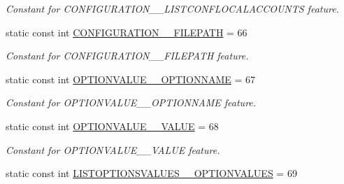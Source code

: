 \begin{DoxyCompactItemize}
\begin{DoxyCompactList}\small\item\em Constant for CONFIGURATION\_\-\_\-LISTCONFLOCALACCOUNTS feature. \item\end{DoxyCompactList}\item 
\hypertarget{classUMS__Data_1_1UMS__DataPackage_a11a26558a6ddebfaa0aae8301e531b5c}{
static const int \hyperlink{classUMS__Data_1_1UMS__DataPackage_a11a26558a6ddebfaa0aae8301e531b5c}{CONFIGURATION\_\-\_\-FILEPATH} = 66}
\label{classUMS__Data_1_1UMS__DataPackage_a11a26558a6ddebfaa0aae8301e531b5c}

\begin{DoxyCompactList}\small\item\em Constant for CONFIGURATION\_\-\_\-FILEPATH feature. \item\end{DoxyCompactList}\item 
\hypertarget{classUMS__Data_1_1UMS__DataPackage_a324aac930bc7bada5a57e26f3a570b18}{
static const int \hyperlink{classUMS__Data_1_1UMS__DataPackage_a324aac930bc7bada5a57e26f3a570b18}{OPTIONVALUE\_\-\_\-OPTIONNAME} = 67}
\label{classUMS__Data_1_1UMS__DataPackage_a324aac930bc7bada5a57e26f3a570b18}

\begin{DoxyCompactList}\small\item\em Constant for OPTIONVALUE\_\-\_\-OPTIONNAME feature. \item\end{DoxyCompactList}\item 
\hypertarget{classUMS__Data_1_1UMS__DataPackage_a3a6ade9c935dfe14bce64cc33cf4af4b}{
static const int \hyperlink{classUMS__Data_1_1UMS__DataPackage_a3a6ade9c935dfe14bce64cc33cf4af4b}{OPTIONVALUE\_\-\_\-VALUE} = 68}
\label{classUMS__Data_1_1UMS__DataPackage_a3a6ade9c935dfe14bce64cc33cf4af4b}

\begin{DoxyCompactList}\small\item\em Constant for OPTIONVALUE\_\-\_\-VALUE feature. \item\end{DoxyCompactList}\item 
\hypertarget{classUMS__Data_1_1UMS__DataPackage_a1ab37ab84bcd814beafc48c437d723c1}{
static const int \hyperlink{classUMS__Data_1_1UMS__DataPackage_a1ab37ab84bcd814beafc48c437d723c1}{LISTOPTIONSVALUES\_\-\_\-OPTIONVALUES} = 69}
\label{classUMS__Data_1_1UMS__DataPackage_a1ab37ab84bcd814beafc48c437d723c1}


\end{DoxyCompactItemize}

